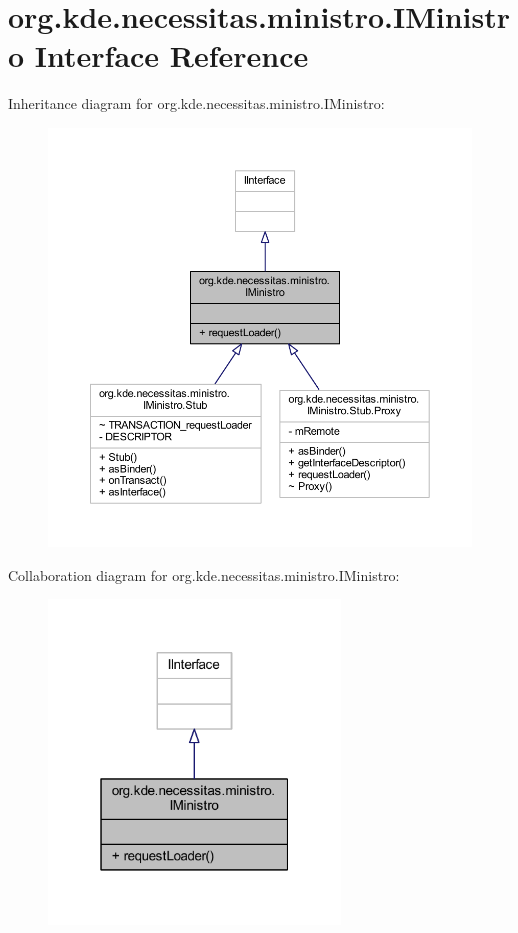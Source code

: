 \hypertarget{interfaceorg_1_1kde_1_1necessitas_1_1ministro_1_1_i_ministro}{\section{org.\-kde.\-necessitas.\-ministro.\-I\-Ministro Interface Reference}
\label{d6/d72/interfaceorg_1_1kde_1_1necessitas_1_1ministro_1_1_i_ministro}
}


Inheritance diagram for org.\-kde.\-necessitas.\-ministro.\-I\-Ministro\-:\nopagebreak
\begin{figure}[H]
\begin{center}
\leavevmode
\includegraphics[width=350pt]{de/df5/interfaceorg_1_1kde_1_1necessitas_1_1ministro_1_1_i_ministro__inherit__graph}
\end{center}
\end{figure}


Collaboration diagram for org.\-kde.\-necessitas.\-ministro.\-I\-Ministro\-:\nopagebreak
\begin{figure}[H]
\begin{center}
\leavevmode
\includegraphics[width=220pt]{d4/dbe/interfaceorg_1_1kde_1_1necessitas_1_1ministro_1_1_i_ministro__coll__graph}
\end{center}
\end{figure}
